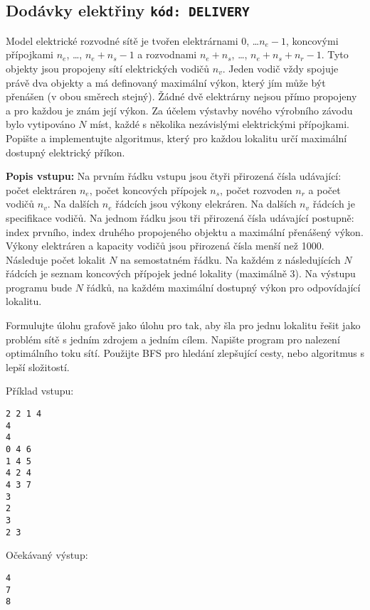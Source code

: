 \documentclass[a4paper,10pt]{article}
\begin{document}


\subsection{Dodávky elektřiny \hfill{\tt kód: DELIVERY}}
Model elektrické rozvodné sítě je tvořen elektrárnami $0$, \dots $n_e-1$, koncovými přípojkami $n_e$, \dots, $n_e+n_s-1$ a rozvodnami $n_e+n_s$, \dots, $n_e+n_s+n_r-1$. Tyto objekty jsou propojeny sítí elektrických vodičů $n_v$. Jeden vodič vždy spojuje právě dva objekty a má definovaný maximální výkon, který jím může být přenášen (v obou směrech stejný). Žádné dvě elektrárny nejsou přímo propojeny a pro každou je znám její výkon. Za účelem výstavby nového výrobního závodu bylo vytipováno $N$ míst, každé s několika nezávislými elektrickými přípojkami. 
Popište a implementujte algoritmus, který pro každou lokalitu určí maximální dostupný elektrický příkon.

{\bf Popis vstupu: }
Na prvním řádku vstupu jsou čtyři přirozená čísla udávající: počet elektráren $n_e$, počet koncových přípojek $n_s$, počet rozvoden $n_r$  a počet vodičů $n_v$. Na dalších $n_e$ řádcích jsou výkony elekráren. Na dalších $n_v$ řádcích je specifikace vodičů. Na jednom řádku jsou tři přirozená čísla udávající postupně: index prvního, index druhého propojeného objektu a maximální přenášený výkon.
Výkony elektráren a kapacity vodičů jsou přirozená čísla menší než 1000.
Následuje počet lokalit $N$ na semostatném řádku. Na každém z následujících $N$ řádcích je seznam koncových přípojek jedné lokality (maximálně 3).
Na výstupu programu bude $N$ řádků, na každém maximální dostupný výkon pro odpovídající lokalitu.


Formulujte úlohu grafově jako úlohu pro tak, aby šla pro jednu lokalitu řešit jako problém sítě s jedním zdrojem a jedním cílem. Napište program pro nalezení optimálního toku sítí. Použijte BFS pro hledání zlepšující cesty, nebo algoritmus s lepší složitostí.


Příklad vstupu:
\begin{verbatim}
2 2 1 4
4
4
0 4 6
1 4 5
4 2 4
4 3 7
3
2
3
2 3
\end{verbatim}

Očekávaný výstup:
\begin{verbatim}
4
7
8
\end{verbatim}
\end{document}

